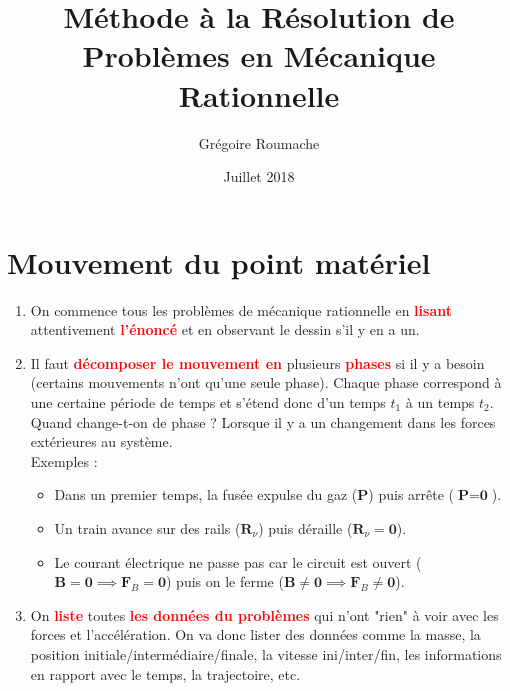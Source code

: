 \documentclass[a4paper]{article}
\title{Méthode à la Résolution de Problèmes en Mécanique Rationnelle}
\author{Grégoire Roumache}
\date{Juillet 2018}
\begin{document}
\maketitle

\section{Mouvement du point matériel}





\begin{enumerate}





\item On commence tous les problèmes de mécanique rationnelle en \textcolor{red}{\textbf{lisant}} attentivement \textcolor{red}{\textbf{l'énoncé}} et en observant le dessin s'il y en a un.





\item Il faut \textcolor{red}{\textbf{décomposer le mouvement en}} plusieurs \textcolor{red}{\textbf{phases}} si il y a besoin (certains mouvements n'ont qu'une seule phase). Chaque phase correspond à une certaine période de temps et s'étend donc d'un temps $ t_1 $ à un temps $ t_2 $. Quand change-t-on de phase ? Lorsque il y a un changement dans les forces extérieures au système. \\
Exemples : 
\begin{itemize}
\item Dans un premier temps, la fusée expulse du gaz (\textbf{P}) puis arrête ($ \textbf{P} = \textbf{0} $).
\item Un train avance sur des rails ($ \textbf{R}_\nu $) puis déraille ($ \textbf{R}_\nu = \textbf{0} $).
\item Le courant électrique ne passe pas car le circuit est ouvert ($ \textbf{B} = \textbf{0} \implies \textbf{F}_B = \textbf{0} $) puis on le ferme ($ \textbf{B} \neq \textbf{0} \implies \textbf{F}_B \neq \textbf{0} $).
\end{itemize}





\item On \textcolor{red}{\textbf{liste}} toutes \textcolor{red}{\textbf{les données du problèmes}} qui n'ont "rien" à voir avec les forces et l'accélération. On va donc lister des données comme la masse, la position initiale/intermédiaire/finale, la vitesse ini/inter/fin, les informations en rapport avec le temps, la trajectoire, etc.






\end{enumerate}
\end{document}
